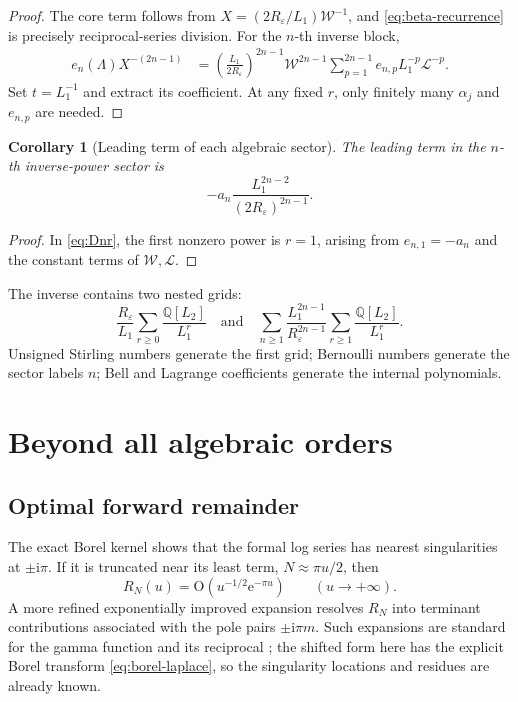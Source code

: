 \documentclass[11pt,a4paper,oneside]{book}
\newtheorem{corollary}[theorem]{Corollary}
\newcommand{\Q}{\mathbb Q}
\newcommand{\e}{\mathrm e}
\newcommand{\ii}{\mathrm i}
\newcommand{\Ord}{\mathrm O}
\newcommand{\eps}{\varepsilon}
\begin{document}
\begin{proof}
The core term follows from
\(X=(2R_\eps/L_1)\mathcal W^{-1}\), and
\cref{eq:beta-recurrence} is precisely reciprocal-series division.
For the \(n\)-th inverse block,
\begin{align*}
 e_n(\Lambda)X^{-(2n-1)}
 &=
 \left(\frac{L_1}{2R_\eps}\right)^{2n-1}
 \mathcal W^{2n-1}
 \sum_{p=1}^{2n-1}
 e_{n,p}L_1^{-p}\mathcal L^{-p}.
\end{align*}
Set \(t=L_1^{-1}\) and extract its coefficient.  At any fixed \(r\), only
finitely many \(\alpha_j\) and \(e_{n,p}\) are needed.
\end{proof}

\begin{corollary}[Leading term of each algebraic sector]
The leading term in the \(n\)-th inverse-power sector is
\begin{equation}\label{eq:sector-leading}
 -a_n
 \frac{L_1^{2n-2}}{(2R_\eps)^{2n-1}}.
\end{equation}
\end{corollary}

\begin{proof}
In \cref{eq:Dnr}, the first nonzero power is \(r=1\), arising from
\(e_{n,1}=-a_n\) and the constant terms of \(\mathcal W,\mathcal L\).
\end{proof}

\begin{summarybox}
The inverse contains two nested grids:
\[
 \frac{R_\eps}{L_1}
 \sum_{r\ge0}\frac{\Q[L_2]}{L_1^r}
 \quad\text{and}\quad
 \sum_{n\ge1}
 \frac{L_1^{2n-1}}{R_\eps^{2n-1}}
 \sum_{r\ge1}\frac{\Q[L_2]}{L_1^r}.
\]
Unsigned Stirling numbers generate the first grid; Bernoulli numbers generate
the sector labels \(n\); Bell and Lagrange coefficients generate the internal
polynomials.
\end{summarybox}

\chapter{Beyond all algebraic orders}

\section{Optimal forward remainder}

The exact Borel kernel shows that the formal log series has nearest singularities
at \(\pm\ii\pi\).  If it is truncated near its least term,
\(N\approx\pi u/2\), then
\[
 R_N(u)=\Ord\!\left(u^{-1/2}\e^{-\pi u}\right)
 \qquad(u\to+\infty).
\]
A more refined exponentially improved expansion resolves \(R_N\) into
terminant contributions associated with the pole pairs
\(\pm\ii\pi m\).  Such expansions are standard for the gamma function and its
reciprocal \cite{Nemes2015}; the shifted form here has the explicit Borel
transform \cref{eq:borel-laplace}, so the singularity locations and residues
are already known.
\end{document}
